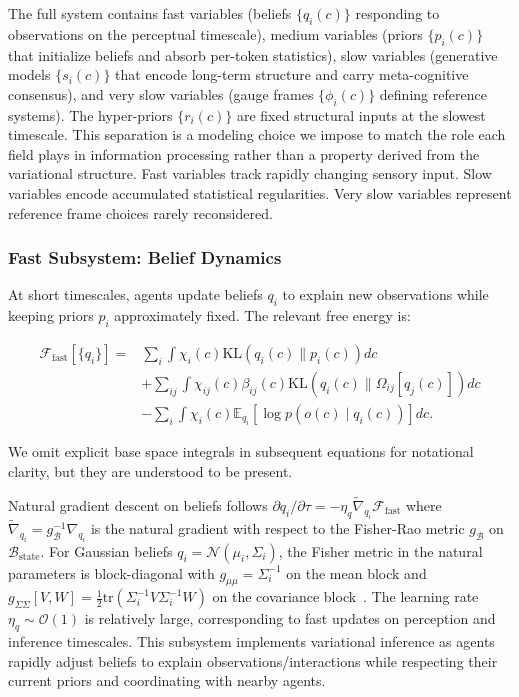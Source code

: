 \documentclass[11pt]{article}
\begin{document}
The full system contains fast variables (beliefs $\{q_i(c)\}$ responding to observations on the perceptual timescale), medium variables (priors $\{p_i(c)\}$ that initialize beliefs and absorb per-token statistics), slow variables (generative models $\{s_i(c)\}$ that encode long-term structure and carry meta-cognitive consensus), and very slow variables (gauge frames $\{\phi_i(c)\}$ defining reference systems). The hyper-priors $\{r_i(c)\}$ are fixed structural inputs at the slowest timescale. This separation is a modeling choice we impose to match the role each field plays in information processing rather than a property derived from the variational structure. Fast variables track rapidly changing sensory input. Slow variables encode accumulated statistical regularities. Very slow variables represent reference frame choices rarely reconsidered.

\subsubsection{Fast Subsystem: Belief Dynamics}

At short timescales, agents update beliefs $q_i$ to explain new observations while keeping priors $p_i$ approximately fixed. The relevant free energy is:

\begin{align}
\mathcal{F}_{\text{fast}}[\{q_i\}] = {}& \sum_i \int \chi_i(c)  \mathrm{KL}(q_i(c) \| p_i(c))  dc \nonumber\\
&+ \sum_{ij} \int \chi_{ij}(c)  \beta_{ij}(c)  \mathrm{KL}(q_i(c) \| \Omega_{ij}[q_j(c)])  dc \nonumber\\
&- \sum_i \int \chi_i(c)  \mathbb{E}_{q_i}[\log p(o(c) \mid q_i(c))]  dc.
\end{align}

We omit explicit base space integrals in subsequent equations for notational clarity, but they are understood to be present.

Natural gradient descent on beliefs follows $\partial q_i/\partial \tau = -\eta_q  \tilde{\nabla}_{q_i} \mathcal{F}_{\text{fast}}$ where $\tilde{\nabla}_{q_i} = g_{\mathcal{B}}^{-1} \nabla_{q_i}$ is the natural gradient with respect to the Fisher-Rao metric $g_{\mathcal{B}}$ on $\mathcal{B}_{\mathrm{state}}$. For Gaussian beliefs $q_i = \mathcal{N}(\mu_i, \Sigma_i)$, the Fisher metric in the natural parameters is block-diagonal with $g_{\mu\mu} = \Sigma_i^{-1}$ on the mean block and $g_{\Sigma\Sigma}[V, W] = \tfrac{1}{2}\mathrm{tr}(\Sigma_i^{-1} V \Sigma_i^{-1} W)$ on the covariance block~\cite{Amari2016}. The learning rate $\eta_q \sim \mathcal{O}(1)$ is relatively large, corresponding to fast updates on perception and inference timescales. This subsystem implements variational inference as agents rapidly adjust beliefs to explain observations/interactions while respecting their current priors and coordinating with nearby agents.
\end{document}
